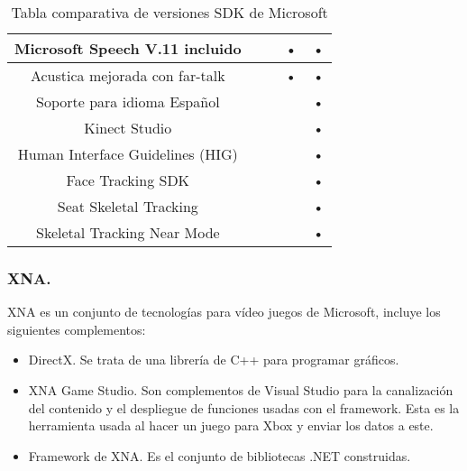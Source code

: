 \documentclass[11pt,a4paper]{article}
\begin{document}
\begin{table}[h]
\begin{tabular}{||c||c||c||c||c||}
		\hline Microsoft Speech V.11 incluido           &        &        & •         & •           \\  
		\hline Acustica mejorada con far-talk           &        &        & •         & •           \\  
		\hline Soporte para idioma Español              &        &        &           & •           \\ 
		\hline Kinect Studio                            &        &        &           & •           \\ 
		\hline Human Interface Guidelines (HIG)         &        &        &           & •           \\ 
		\hline Face Tracking SDK                        &        &        &           & •           \\ 
		\hline Seat Skeletal Tracking                   &        &        &           & •           \\ 
		\hline Skeletal Tracking Near Mode              &        &        &           & •           \\ 
		\hline 
	\end{tabular} 
	\caption{Tabla comparativa de versiones SDK de Microsoft}
	\label{tabla_comparativa}
\end{table}
\subsubsection{XNA.}
XNA es un conjunto de tecnologías para vídeo juegos de Microsoft, incluye los siguientes complementos: 
\begin{itemize}
\item DirectX. Se trata de una librería de C++ para programar gráficos.
\item XNA Game Studio. Son complementos de Visual Studio para la canalización del contenido y el despliegue de funciones usadas con el framework. Esta es la herramienta usada al hacer un juego para Xbox y enviar los datos a este.
\item Framework de XNA. Es el conjunto de bibliotecas .NET construidas.
\end{itemize}
\end{document}
